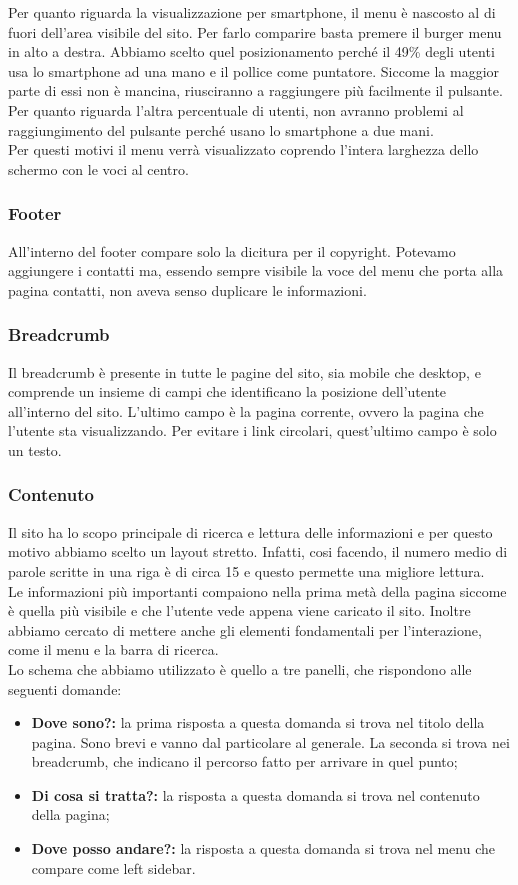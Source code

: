 Per quanto riguarda la visualizzazione per smartphone, il menu è nascosto al di fuori dell'area visibile del sito. Per farlo comparire basta premere il burger menu in alto a destra. Abbiamo scelto quel posizionamento perché il 49\% degli utenti usa lo smartphone ad una mano e il pollice come puntatore. Siccome la maggior parte di essi non è mancina, riusciranno a raggiungere più facilmente il pulsante. Per quanto riguarda l'altra percentuale di utenti, non avranno problemi al raggiungimento del pulsante perché usano lo smartphone a due mani.\\
Per questi motivi il menu verrà visualizzato coprendo l'intera larghezza dello schermo con le voci al centro.

\subsubsection{Footer}
All'interno del footer compare solo la dicitura per il copyright. Potevamo aggiungere i contatti ma, essendo sempre visibile la voce del menu che porta alla pagina contatti, non aveva senso duplicare le informazioni.

\subsubsection{Breadcrumb}
Il breadcrumb è presente in tutte le pagine del sito, sia mobile che desktop, e comprende un insieme di campi che identificano la posizione dell'utente all'interno del sito. L'ultimo campo è la pagina corrente, ovvero la pagina che l'utente sta visualizzando. Per evitare i link circolari, quest'ultimo campo è solo un testo.

\subsubsection{Contenuto}
Il sito ha lo scopo principale di ricerca e lettura delle informazioni e per questo motivo abbiamo scelto un layout stretto. Infatti, cosi facendo, il numero medio di parole scritte in una riga è di circa 15 e questo permette una migliore lettura.\\
Le informazioni più importanti compaiono nella prima metà della pagina siccome è quella più visibile e che l'utente vede appena viene caricato il sito. Inoltre abbiamo cercato di mettere anche gli elementi fondamentali per l'interazione, come il menu e la barra di ricerca.\\
Lo schema che abbiamo utilizzato è quello a tre panelli, che rispondono alle seguenti domande:\\
\begin{itemize}
	\item \textbf{Dove sono?:} la prima risposta a questa domanda si trova nel titolo della pagina. Sono brevi e vanno dal particolare al generale. La seconda si trova nei breadcrumb, che indicano il percorso fatto per arrivare in quel punto;
	\item \textbf{Di cosa si tratta?:} la risposta a questa domanda si trova nel contenuto della pagina;
	\item \textbf{Dove posso andare?:} la risposta a questa domanda si trova nel menu che compare come left sidebar.
\end{itemize}

